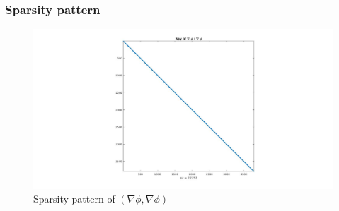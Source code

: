 \documentclass{beamer}
\begin{document}
\begin{frame}
\frametitle{Sparsity pattern}
\begin{figure}
\centering
  \includegraphics[width=\linewidth]{figure1.jpg}
  \caption{Sparsity pattern of $(\nabla \phi,\nabla \phi)$}
  \label{fig:sparsity_del_phi_del_phi}
\end{figure}
\end{frame}

\end{document}
